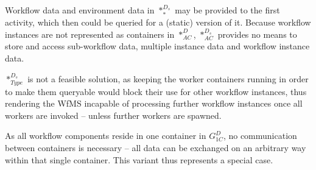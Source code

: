     Workflow data and environment data in $*_{*}^{D_s}$ may be provided to the first activity, which then could be queried for a (static) version of it. Because workflow instances are not represented as containers in $*_{AC}^{D}$, $*_{AC}^{D_s}$ provides no means to store and access sub-workflow data, multiple instance data and workflow instance data.

    $*_{Type}^{D_s}$ is not a feasible solution, as keeping the worker containers running in order to make them queryable would block their use for other workflow instances, thus rendering the \ac{WfMS} incapable of processing further workflow instances once all workers are invoked -- unless further workers are spawned.

  As all workflow components reside in one container in $G_{1C}^{D}$, no communication between containers is necessary -- all data can be exchanged on an arbitrary way within that single container. This variant thus represents a special case.

